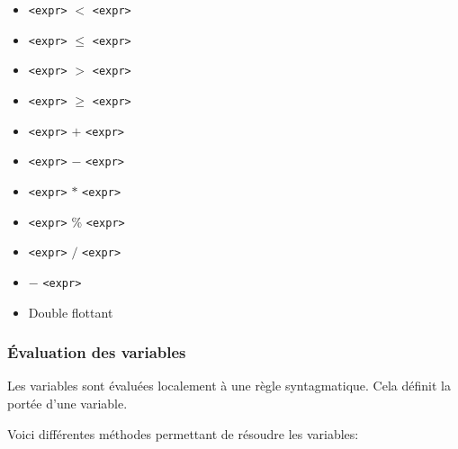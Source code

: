 \documentclass[11pt]{article}
\begin{document}
\begin{itemize}
     \begin{itemize}
    \item \verb#<expr>#  $<$ \verb#<expr>#
    \item \verb#<expr>#  $\le$ \verb#<expr>#
    \item \verb#<expr>#  $>$ \verb#<expr>#
    \item \verb#<expr>#  $\ge$ \verb#<expr>#
    \item \verb#<expr>#  $+$ \verb#<expr>#
    \item \verb#<expr>#  $-$ \verb#<expr>#
    \item \verb#<expr>#  $*$ \verb#<expr>#
    \item \verb#<expr>#  \% \verb#<expr>#
    \item \verb#<expr>#  $/$ \verb#<expr>#
    \item $-$ \verb#<expr>#
    \item Double flottant
    \end{itemize}
    
\end{itemize}

\subsubsection*{Évaluation des variables}

Les variables sont évaluées localement à une règle syntagmatique. Cela
définit la portée d'une variable.

Voici différentes méthodes permettant de résoudre les variables:
\end{document}
